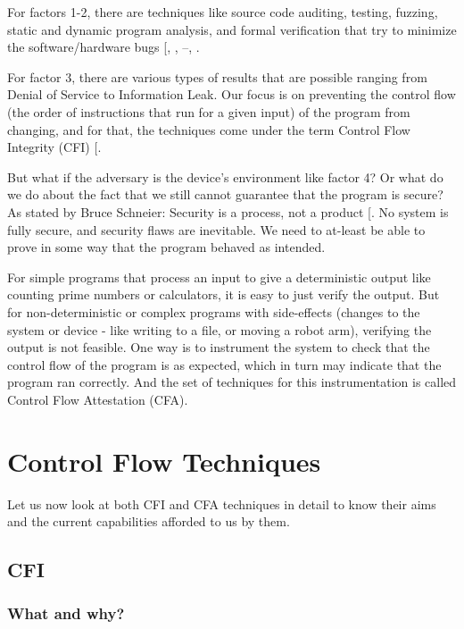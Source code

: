 \documentclass[a4paper, nobind]{templates/ociamthesis}
\begin{document}
For factors 1-2, there are techniques like source code auditing, testing,
fuzzing, static and dynamic program analysis, and formal verification that try
to minimize the software/hardware bugs {[}, , --, \citeproc{ref-quinlan2009source}{45}{]}.

For factor 3, there are various types of results that are possible ranging from
Denial of Service to Information Leak.
Our focus is on preventing the control flow (the order of instructions that run for a given input)
of the program from changing, and for that, the techniques come under the term
Control Flow Integrity (CFI) {[}\citeproc{ref-sok}{5}{]}.

But what if the adversary is the device's environment like factor 4?
Or what do we do about the fact that we still cannot guarantee that the program is secure?
As stated by Bruce Schneier: Security is a process, not a product {[}\citeproc{ref-bruceessay}{48}{]}.
No system is fully secure, and security flaws are inevitable.
We need to at-least be able to prove in some way that the program behaved as intended.

For simple programs that process an input to give a deterministic output like
counting prime numbers or calculators, it is easy to just verify the output.
But for non-deterministic or complex programs with side-effects (changes to the
system or device - like writing to a file, or moving a robot arm), verifying the
output is not feasible. One way is to instrument the system to check that the
control flow of the program is as expected, which in turn may indicate
that the program ran correctly.
And the set of techniques for this instrumentation is called Control Flow
Attestation (CFA).

\section{Control Flow Techniques}\label{control-flow-techniques}

Let us now look at both CFI and CFA techniques in detail to know their aims and the current
capabilities afforded to us by them.

\subsection{CFI}\label{cfi}

\subsubsection{What and why?}\label{what-and-why}
\end{document}
